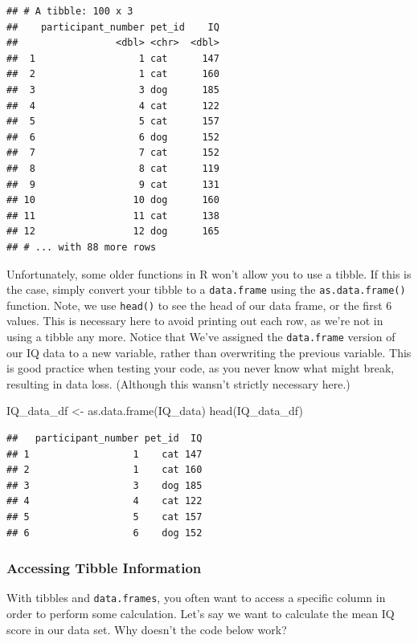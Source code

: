 \documentclass[
]{book}
\newenvironment{Shaded}{\begin{snugshade}}{\end{snugshade}}
\newcommand{\FunctionTok}[1]{\textcolor[rgb]{0.00,0.00,0.00}{#1}}
\newcommand{\NormalTok}[1]{#1}
\newcommand{\OtherTok}[1]{\textcolor[rgb]{0.56,0.35,0.01}{#1}}
\begin{document}
\begin{verbatim}
## # A tibble: 100 x 3
##    participant_number pet_id    IQ
##                 <dbl> <chr>  <dbl>
##  1                  1 cat      147
##  2                  1 cat      160
##  3                  3 dog      185
##  4                  4 cat      122
##  5                  5 cat      157
##  6                  6 dog      152
##  7                  7 cat      152
##  8                  8 cat      119
##  9                  9 cat      131
## 10                 10 dog      160
## 11                 11 cat      138
## 12                 12 dog      165
## # ... with 88 more rows
\end{verbatim}

Unfortunately, some older functions in R won't allow you to use a tibble. If this is the case, simply convert your tibble to a \texttt{data.frame} using the \texttt{as.data.frame()} function. Note, we use \texttt{head()} to see the head of our data frame, or the first 6 values. This is necessary here to avoid printing out each row, as we're not in using a tibble any more. Notice that We've assigned the \texttt{data.frame} version of our IQ data to a new variable, rather than overwriting the previous variable. This is good practice when testing your code, as you never know what might break, resulting in data loss. (Although this wansn't strictly necessary here.)

\begin{Shaded}
\begin{Highlighting}[]
\NormalTok{IQ\_data\_df }\OtherTok{\textless{}{-}} \FunctionTok{as.data.frame}\NormalTok{(IQ\_data)}
\FunctionTok{head}\NormalTok{(IQ\_data\_df)}
\end{Highlighting}
\end{Shaded}

\begin{verbatim}
##   participant_number pet_id  IQ
## 1                  1    cat 147
## 2                  1    cat 160
## 3                  3    dog 185
## 4                  4    cat 122
## 5                  5    cat 157
## 6                  6    dog 152
\end{verbatim}

\hypertarget{accessing-tibble-information}{%
\subsubsection{Accessing Tibble Information}\label{accessing-tibble-information}}

With tibbles and \texttt{data.frames}, you often want to access a specific column in order to perform some calculation. Let's say we want to calculate the mean IQ score in our data set. Why doesn't the code below work?
\end{document}
